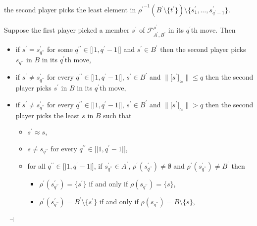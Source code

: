 \documentclass[draft]{article}
\newenvironment{proof}{{\bf Proof:}}{~$\dashv$\\}
\def\lsem{{\lbrack\mid}}
\def\rsem{{\mid\rbrack}}
\begin{document}
\begin{proof}
\begin{itemize}
\begin{itemize}
\begin{itemize}
%
%
\end{itemize}
%
%
\end{itemize}
%
%
the second player picks the least element in ${\rho^{\prime}}^{{-}1}(B^{\prime}{\setminus}\{t^{\prime}\}){\setminus}\{s^{\prime}_{1},\ldots,s^{\prime}_{q^{\prime}{-}1}\}$.
%
%
\end{itemize}
%
%
Suppose the first player picked a member $s^{\prime}$ of ${\mathcal F}_{A^{\prime},B^{\prime}}^{\rho^{\prime}}$ in its $q^{\prime}$th move.
Then
%
%
\begin{itemize}
%
%
\item if $s^{\prime}{=}s^{\prime}_{q^{\prime\prime}}$ for some $q^{\prime\prime}{\in}\lsem1,q^{\prime}{-}1\rsem$ and $s^{\prime}{\in}B^{\prime}$ then the second player picks $s_{q^{\prime\prime}}$ in $B$ in its $q^{\prime}$th move,
%
%
\item if $s^{\prime}{\not=}s^{\prime}_{q^{\prime\prime}}$ for every $q^{\prime\prime}{\in}\lsem1,q^{\prime}{-}1\rsem$, $s^{\prime}{\in}B^{\prime}$ and ${\parallel}\lbrack s^{\prime}\rbrack_{\approx}{\parallel}{\leq}q$ then the second player picks $s^{\prime}$ in $B$ in its $q^{\prime}$th move,
%
%
\item if $s^{\prime}{\not=}s^{\prime}_{q^{\prime\prime}}$ for every $q^{\prime\prime}{\in}\lsem1,q^{\prime}{-}1\rsem$, $s^{\prime}{\in}B^{\prime}$ and ${\parallel}\lbrack s^{\prime}\rbrack_{\approx}{\parallel}{>}q$ then the second player picks the least $s$ in $B$ such that
%
%
\begin{itemize}
%
%
\item $s^{\prime}{\approx}s$,
%
%
\item $s{\not=}s_{q^{\prime\prime}}$ for every $q^{\prime\prime}{\in}\lsem1,q^{\prime}{-}1\rsem$,
%
%
\item for all $q^{\prime\prime}{\in}\lsem1,q^{\prime}{-}1\rsem$, if $s^{\prime}_{q^{\prime\prime}}{\in}A^{\prime}$, $\rho^{\prime}(s^{\prime}_{q^{\prime\prime}}){\not=}\emptyset$ and $\rho^{\prime}(s^{\prime}_{q^{\prime\prime}}){\not=}B^{\prime}$ then
%
%
\begin{itemize}
%
%
\item $\rho^{\prime}(s^{\prime}_{q^{\prime\prime}}){=}\{s^{\prime}\}$ if and only if $\rho(s_{q^{\prime\prime}}){=}\{s\}$,
%
%
\item $\rho^{\prime}(s^{\prime}_{q^{\prime\prime}}){=}B^{\prime}{\setminus}\{s^{\prime}\}$ if and only if $\rho(s_{q^{\prime\prime}}){=}B{\setminus}\{s\}$,
%
%
\end{itemize}
%
%
\end{itemize}

\end{itemize}
\end{proof}
\end{document}

